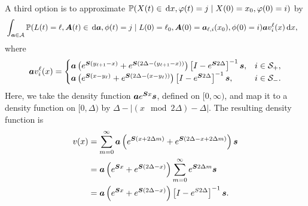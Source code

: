 A third option is to approximate \(\mathbb P(X(t)\in \, \mathrm{d} x  , \varphi(t) = j\mid X(0)=x_0, \varphi(0) = i) \) by
\begin{align}
	\label{eqn: density approx 4+}&
		\displaystyle\int_{\boldsymbol a \in\mathcal A}\mathbb P(L(t) = \ell, \boldsymbol A(t)\in\, \mathrm{d} \boldsymbol a,\phi(t) = j\mid L(0)=\ell_0, \boldsymbol A(0) = \boldsymbol  a_{\ell,i}(x_0), \phi(0) = i) \boldsymbol a v_i^\ell(x) \, \mathrm{d} x ,
\end{align}
{where}
\begin{align}
		\boldsymbol a v_i^\ell(x) = \begin{cases}
			\boldsymbol a \left(e^{ \boldsymbol{S}(y_{\ell+1}-x)} + e^{ \boldsymbol{S}(2\Delta-(y_{\ell+1}-x))} \right)\left[I-e^{\boldsymbol S 2\Delta}\right]^{-1}\boldsymbol s, & i\in\mathcal{S}_+, \\ 
			\boldsymbol a \left(e^{ \boldsymbol{S}(x-y_\ell)}+e^{ \boldsymbol{S}(2\Delta-(x-y_\ell))}\right) \left[I-e^{\boldsymbol S 2\Delta}\right]^{-1}\boldsymbol s, & i\in\mathcal{S}_-. \\ 
		\end{cases}
\end{align}
Here, we take the density function \(\boldsymbol a e^{\boldsymbol S x}\boldsymbol s\), defined on \([0,\infty)\), and map it to a density function on \([0,\Delta)\) by \(\Delta - |(x \mod 2\Delta )-\Delta|\). The resulting density function is 
\begin{align*}
	v(x) &= \sum_{m=0}^\infty \boldsymbol a \left(e^{\boldsymbol S (x+2\Delta m)} + e^{\boldsymbol S (2\Delta -x+2\Delta m)} \right)\boldsymbol s
	\\&= \boldsymbol a \left(e^{\boldsymbol S x} + e^{\boldsymbol S (2\Delta -x)} \right)\sum_{m=0}^\infty e^{\boldsymbol S 2\Delta m} \boldsymbol s
	\\&= \boldsymbol a \left(e^{\boldsymbol S x} + e^{\boldsymbol S (2\Delta -x)} \right)\left[I-e^{S2\Delta}\right]^{-1} \boldsymbol s.
\end{align*}


